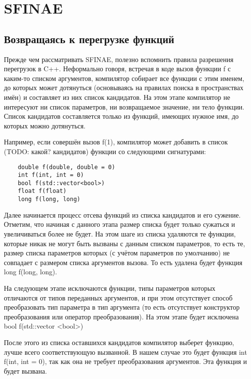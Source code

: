 \section{SFINAE}

\subsection{Возвращаясь к перегрузке функций}


Прежде чем рассматривать SFINAE, полезно вспомнить правила разрешения перегрузок в C++. Неформально говоря, встречая в коде вызов функции f с каким-то списком аргументов, компилятор собирает все функции с этим именем, до которых может дотянуться (основываясь на правилах поиска в пространствах имён) и составляет из них список кандидатов.
На этом этапе компилятор не интересуют ни список параметров, ни возвращаемое значение, ни тело функции. Список кандидатов составляется только из функций, имеющих нужное имя, до которых можно дотянуться.
	
	
	Например, если совершён вызов f(1), компилятор может добавить в список (TODO: какой? кандидатов) функции со следующими сигнатурами:
	
	\begin{verbatim}
	double f(double, double = 0)
	int f(int, int = 0)
	bool f(std::vector<bool>)
	float f(float)
	long f(long, long)
	\end{verbatim}
	
	Далее начинается процесс отсева функций из списка кандидатов и его сужение. Отметим, что начиная с данного этапа размер списка будет только сужаться и увеличиваться более не будет. На этом шаге из списка удаляются те функции, которые никак не могут быть вызваны с данным списком параметров, то есть те, размер списка параметров которых (с учётом параметров по умолчанию) не совпадает с размером списка аргументов вызова. То есть удалена будет функция long f(long, long).
	
	На следующем этапе исключаются функции, типы параметров которых отличаются от типов переданных аргументов, и при этом отсутствует способ преобразовать тип параметра в тип аргумента (то есть отсутствует конструктор преобразования или оператор преобразования). На этом этапе будет исключена 
bool f(std::vector <bool>)
	
	После этого из списка оставшихся кандидатов компилятор выберет функцию, лучше всего соответствующую вызванной. В нашем случае это будет функция 
int f(int, int = 0), так как она не требует преобразования аргументов. Эта функция и будет вызвана. 

